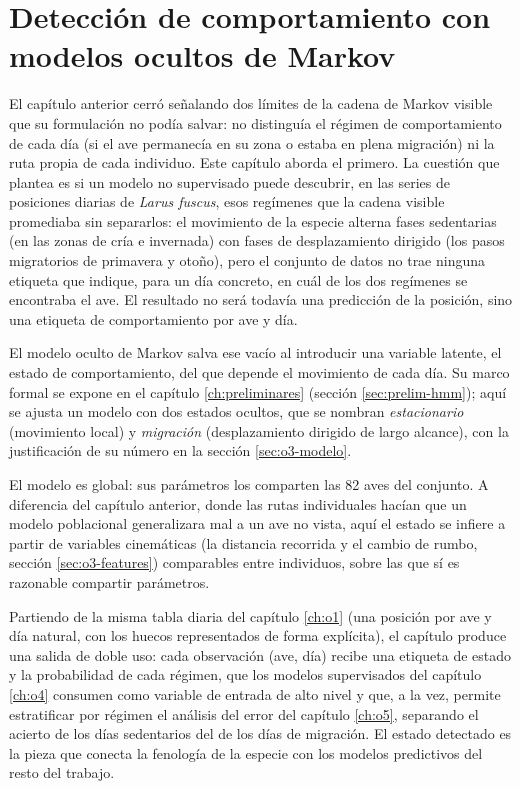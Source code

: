 \chapter{Detección de comportamiento con modelos ocultos de Markov}
\label{ch:o3}

El capítulo anterior cerró señalando dos límites de la cadena de Markov visible que
su formulación no podía salvar: no distinguía el régimen de comportamiento de cada
día (si el ave permanecía en su zona o estaba en plena migración) ni la ruta propia
de cada individuo. Este capítulo aborda el primero. La cuestión que plantea es si un
modelo no supervisado puede descubrir, en las series de posiciones diarias de
\textit{Larus fuscus}, esos regímenes que la cadena visible promediaba sin
separarlos: el movimiento de la especie alterna fases sedentarias (en las zonas de
cría e invernada) con fases de desplazamiento dirigido (los pasos migratorios de
primavera y otoño), pero el conjunto de datos no trae ninguna etiqueta que indique,
para un día concreto, en cuál de los dos regímenes se encontraba el ave. El resultado
no será todavía una predicción de la posición, sino una etiqueta de comportamiento
por ave y día.

El modelo oculto de Markov salva ese vacío al introducir una variable latente, el
estado de comportamiento, del que depende el movimiento de cada día. Su marco formal se
expone en el capítulo \ref{ch:preliminares} (sección \ref{sec:prelim-hmm}); aquí se
ajusta un modelo con dos estados ocultos, que se nombran \emph{estacionario}
(movimiento local) y \emph{migración} (desplazamiento dirigido de largo alcance), con
la justificación de su número en la sección \ref{sec:o3-modelo}.

El modelo es global: sus parámetros los comparten las 82 aves del conjunto. A
diferencia del capítulo anterior, donde las rutas individuales hacían que un modelo
poblacional generalizara mal a un ave no vista, aquí el estado se infiere a partir de
variables cinemáticas (la distancia recorrida y el cambio de rumbo, sección
\ref{sec:o3-features}) comparables entre individuos, sobre las que sí es razonable
compartir parámetros.

Partiendo de la misma tabla diaria del capítulo \ref{ch:o1} (una posición por ave y
día natural, con los huecos representados de forma explícita), el capítulo produce una
salida de doble uso: cada observación (ave, día) recibe una etiqueta de estado y la
probabilidad de cada régimen, que los modelos supervisados del capítulo \ref{ch:o4}
consumen como variable de entrada de alto nivel y que, a la vez, permite estratificar
por régimen el análisis del error del capítulo \ref{ch:o5}, separando el acierto de
los días sedentarios del de los días de migración. El estado detectado es la pieza que
conecta la fenología de la especie con los modelos predictivos del resto del trabajo.

